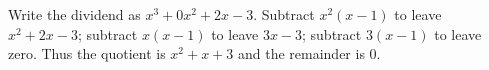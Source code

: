 Write the dividend as $x^3+0x^2+2x-3$. Subtract $x^2(x-1)$ to leave $x^2+2x-3$; subtract $x(x-1)$ to leave $3x-3$; subtract $3(x-1)$ to leave zero. Thus the quotient is $\boxed{x^2+x+3}$ and the remainder is $\boxed0$.
